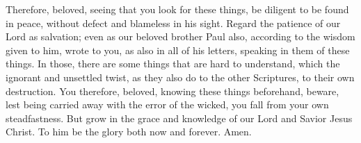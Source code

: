  Therefore, beloved, seeing that you look for these
things, be diligent to be found in peace, without defect and blameless
in his sight.  Regard the patience of our Lord as
salvation; even as our beloved brother Paul also, according to the
wisdom given to him, wrote to you,  as also in all of his
letters, speaking in them of these things. In those, there are some
things that are hard to understand, which the ignorant and unsettled
twist, as they also do to the other Scriptures, to their own
destruction.  You therefore, beloved, knowing these
things beforehand, beware, lest being carried away with the error of the
wicked, you fall from your own steadfastness.  But grow
in the grace and knowledge of our Lord and Savior Jesus Christ. To him
be the glory both now and forever. Amen.
